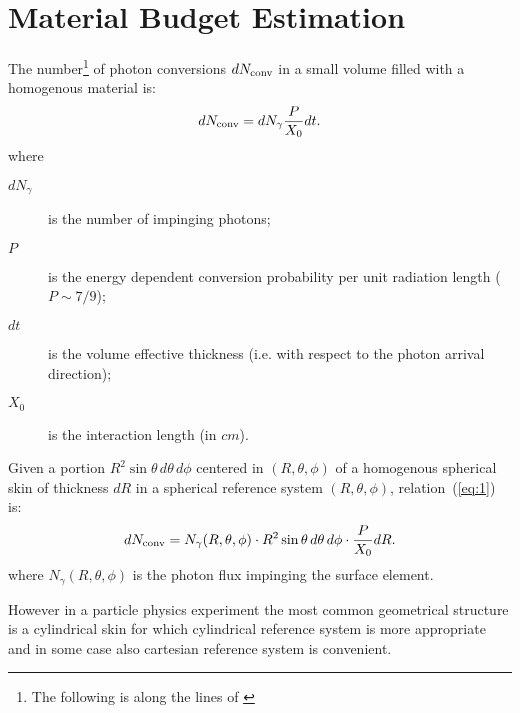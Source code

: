 \section{Material Budget Estimation}
\label{correctionFactors}

The number\footnote{The following is along the lines of \cite{steve}} of photon conversions $dN_{\rm conv}$ in a
small volume filled with a homogenous material is:
\begin{equation}
dN_{\rm conv} = dN_{\gamma} \frac{P}{X_0} dt .
\label{eq:1}
\end{equation}
where
\begin{description}
\item[$dN_\gamma$] is the number of impinging photons;\\
\item[$P$] is the energy dependent conversion probability per unit
radiation length ($P\sim 7/9$);\\
\item[$dt$] is the volume effective thickness (i.e. with respect to the photon arrival direction);\\
\item[$X_0$] is the interaction length (in $cm$).%
\end{description}

Given a portion $R^2 \sin \theta\, d\theta\, d\phi$ centered in $(R,\theta,\phi)$ of a homogenous spherical skin of 
thickness $dR$ in a spherical reference system $(R, \theta, \phi)$,
relation~(\ref{eq:1}) is:
\begin{equation}
dN_{\rm conv} = N_{\gamma}(R, \theta, \phi) \cdot R^2 \sin \theta \, d\theta\, d\phi \cdot \frac{P}{X_0} dR .
\label{eq:2}
\end{equation}
where $N_\gamma(R,\theta,\phi)$ is the photon flux impinging the surface element.

However in a particle physics experiment the most common geometrical
structure is a cylindrical skin for which cylindrical reference system
is more appropriate and in some case also cartesian reference system
is convenient.

